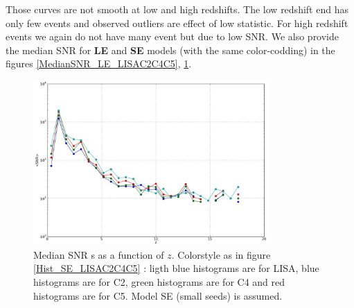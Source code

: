 \documentclass{iopart}
\begin{document}
Those curves are not smooth at low and high redshifts. The low redshift end has only few events and observed 
outliers are effect of low statistic.  For high redshift events we again do not have many event but due to low SNR. 
We also provide the median SNR for {\bf LE} and {\bf SE} models (with the same color-codding)  in the figures 
\ref{MedianSNR_LE_LISAC2C4C5}, \ref{MedianSNR_SE_LISAC2C4C5}.







 





\begin{figure}[H]
\center
   \includegraphics[width=0.8\textwidth]{FigSMBHPhenomAEI/MedianSNR_SE_LISAC2C4C5.eps}
\caption{Median SNR s as a function of  $z$. Colorstyle as in figure \ref{Hist_SE_LISAC2C4C5} : ligth blue histograms are for LISA, blue histograms are for C2, green histograms are for C4 and red histograms are for C5. Model SE (small seeds) is assumed.
\label{MedianSNR_SE_LISAC2C4C5} } 
\end{figure}
\end{document}
